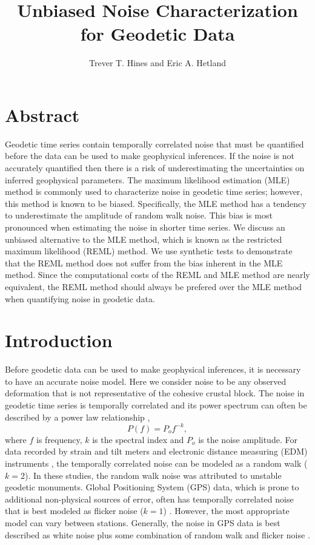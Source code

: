 \documentclass[10pt,a4paper]{article}
\title{Unbiased Noise Characterization for Geodetic Data}
\author{Trever T. Hines and Eric A. Hetland}
\begin{document}
\maketitle

\section{Abstract}\label{sec:Abstract}
Geodetic time series contain temporally correlated noise that must be quantified before the data can be used to make geophysical inferences. If the noise is not accurately quantified then there is a risk of underestimating the uncertainties on inferred geophysical parameters. The maximum likelihood estimation (MLE) method is commonly used to characterize noise in geodetic time series; however, this method is known to be biased. Specifically, the MLE method has a tendency to underestimate the amplitude of random walk noise. This bias is most pronounced when estimating the noise in shorter time series. We discuss an unbiased alternative to the MLE method, which is known as the restricted maximum likelihood (REML) method. We use synthetic tests to demonstrate that the REML method does not suffer from the bias inherent in the MLE method. Since the computational costs of the REML and MLE method are nearly equivalent, the REML method should always be prefered over the MLE method when quantifying noise in geodetic data.   

\section{Introduction}\label{sec:Introduction}

Before geodetic data can be used to make geophysical inferences, it is necessary to have an accurate noise model. Here we consider noise to be any observed deformation that is not representative of the cohesive crustal block. The noise in geodetic time series is temporally correlated and its power spectrum can often be described by a power law relationship \citep{Agnew1992},       
\begin{equation}\label{eq.PowerLaw}
  P(f) = P_o f^{-k},
\end{equation}
where $f$ is frequency, $k$ is the spectral index and $P_o$ is the noise amplitude. For data recorded by strain and tilt meters \citep{Wyatt1982,Wyatt1989} and electronic distance measuring (EDM) instruments \citep{Langbein1997}, the temporally correlated noise can be modeled as a random walk ($k = 2$). In these studies, the random walk noise was attributed to unstable geodetic monuments. Global Positioning System (GPS) data, which is prone to additional non-physical sources of error, often has temporally correlated noise that is best modeled as flicker noise ($k = 1$) \citep{Zhang1997,Mao1999,Williams2004}. However, the most appropriate model can vary between stations. Generally, the noise in GPS data is best described as white noise plus some combination of random walk and flicker noise \citep{Langbein2008}. 
\end{document}
